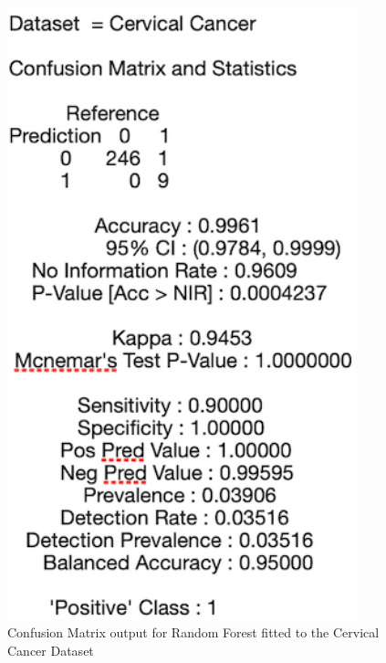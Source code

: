 \begin{figure}[!htbp]
    \centering
    \begin{minipage}{0.45\textwidth}
        \centering
        \includegraphics[width=0.9\textwidth]{ThesisTemplate/appendix/images/Chapter5Appendix/ConfusionMatrix/CervicalCancer.png} 
        \caption{Confusion Matrix output for Random Forest fitted to the Cervical Cancer Dataset}
        \label{fig:matrixCC}
    \end{minipage}\hfill
    \begin{minipage}{0.45\textwidth}
        \centering

\end{minipage}
\end{figure}

